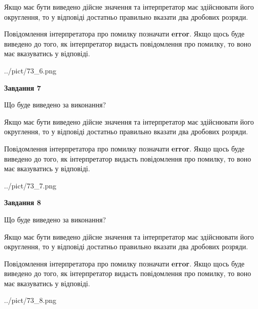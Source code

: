 \documentclass[12pt, ukrainian]{article}
\begin{document}
{\begin {Large}
Якщо має бути виведено дійсне значення та інтерпретатор має здійснювати його округлення, 
то у відповіді достатньо правильно вказати два дробових розряди.

Повідомлення інтерпретатора про помилку позначати \textbf{error}.
Якщо щось буде виведено до того, як інтерпретатор видасть повідомлення про помилку, 
то воно має вказуватись у відповіді. \par

\begin{center}
	{../pict/73_6.png}
\end{center}
\newpage

{\begin {center}\textbf{Завдання 7}\end {center}}\par
Що буде виведено за виконання? \par

Якщо має бути виведено дійсне значення та інтерпретатор має здійснювати його округлення, 
то у відповіді достатньо правильно вказати два дробових розряди.

Повідомлення інтерпретатора про помилку позначати \textbf{error}.
Якщо щось буде виведено до того, як інтерпретатор видасть повідомлення про помилку, 
то воно має вказуватись у відповіді. \par

\begin{center}
	{../pict/73_7.png}
\end{center}
\newpage

{\begin {center}\textbf{Завдання 8}\end {center}}\par
Що буде виведено за виконання? \par

Якщо має бути виведено дійсне значення та інтерпретатор має здійснювати його округлення, 
то у відповіді достатньо правильно вказати два дробових розряди.

Повідомлення інтерпретатора про помилку позначати \textbf{error}.
Якщо щось буде виведено до того, як інтерпретатор видасть повідомлення про помилку, 
то воно має вказуватись у відповіді. \par

\begin{center}
	{../pict/73_8.png}
\end{center}
\newpage


\end{Large}}
\end{document}
